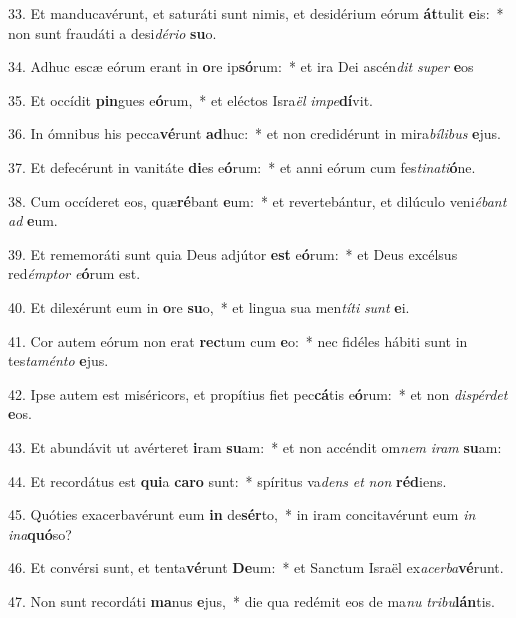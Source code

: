33. Et manducavérunt, et saturáti sunt nimis, et desidérium eórum \textbf{át}tulit \textbf{e}is:~*  non sunt fraudáti a desi\textit{dé}\textit{ri}\textit{o} \textbf{su}o.\

34. Adhuc escæ eórum erant in \textbf{o}re ip\textbf{só}rum:~*  et ira Dei ascén\textit{dit} \textit{su}\textit{per} \textbf{e}os\

35. Et occídit \textbf{pin}gues e\textbf{ó}rum,~*  et eléctos Isra\textit{ël} \textit{im}\textit{pe}\textbf{dí}vit.\

36. In ómnibus his pecca\textbf{vé}runt \textbf{ad}huc:~*  et non credidérunt in mira\textit{bí}\textit{li}\textit{bus} \textbf{e}jus.\

37. Et defecérunt in vanitáte \textbf{di}es e\textbf{ó}rum:~*  et anni eórum cum fes\textit{ti}\textit{na}\textit{ti}\textbf{ó}ne.\

38. Cum occíderet eos, quæ\textbf{ré}bant \textbf{e}um:~*  et revertebántur, et dilúculo veni\textit{é}\textit{bant} \textit{ad} \textbf{e}um.\

39. Et rememoráti sunt quia Deus adjútor \textbf{est} e\textbf{ó}rum:~*  et Deus excélsus red\textit{émp}\textit{tor} \textit{e}\textbf{ó}rum est.\

40. Et dilexérunt eum in \textbf{o}re \textbf{su}o,~*  et lingua sua men\textit{tí}\textit{ti} \textit{sunt} \textbf{e}i.\

41. Cor autem eórum non erat \textbf{rec}tum cum \textbf{e}o:~*  nec fidéles hábiti sunt in tes\textit{ta}\textit{mén}\textit{to} \textbf{e}jus.\

42. Ipse autem est miséricors, et propítius fiet pec\textbf{cá}tis e\textbf{ó}rum:~*  et non \textit{dis}\textit{pér}\textit{det} \textbf{e}os.\

43. Et abundávit ut avérteret \textbf{i}ram \textbf{su}am:~*  et non accéndit om\textit{nem} \textit{i}\textit{ram} \textbf{su}am:\

44. Et recordátus est \textbf{qui}a \textbf{ca}\textbf{ro} sunt:~*  spíritus va\textit{dens} \textit{et} \textit{non} \textbf{réd}iens.\

45. Quóties exacerbavérunt eum \textbf{in} de\textbf{sér}to,~*  in iram concitavérunt eum \textit{in} \textit{in}\textit{a}\textbf{quó}so?\

46. Et convérsi sunt, et tenta\textbf{vé}runt \textbf{De}um:~*  et Sanctum Israël ex\textit{a}\textit{cer}\textit{ba}\textbf{vé}runt.\

47. Non sunt recordáti \textbf{ma}nus \textbf{e}jus,~*  die qua redémit eos de ma\textit{nu} \textit{tri}\textit{bu}\textbf{lán}tis.\

